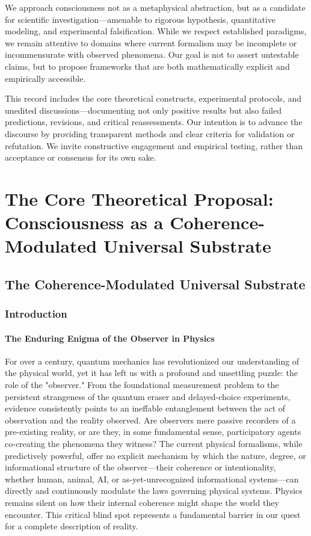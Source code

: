 \documentclass{report}
\begin{document}
We approach consciousness not as a metaphysical abstraction, but as a candidate for scientific investigation—amenable to rigorous hypothesis, quantitative modeling, and experimental
falsification. While we respect established paradigms, we remain attentive to domains where
current formalism may be incomplete or incommensurate with observed phenomena. Our goal
is not to assert untestable claims, but to propose frameworks that are both mathematically
explicit and empirically accessible.

This record includes the core theoretical constructs, experimental protocols, and unedited
discussions—documenting not only positive results but also failed predictions, revisions, and critical reassessments. Our intention is to advance the discourse by providing transparent methods
and clear criteria for validation or refutation. We invite constructive engagement and empirical
testing, rather than acceptance or consensus for its own sake.
\newpage


\part{The Core Theoretical Proposal: Consciousness as a Coherence-Modulated Universal Substrate}
\label{part:core_proposal}

\chapter{The Coherence-Modulated Universal Substrate} %
\label{ch:substrate_theory}
\section{Introduction}
\label{sec:intro_substrate}
    \subsection{The Enduring Enigma of the Observer in Physics}
    \label{subsec:enigma_observer}
    For over a century, quantum mechanics has revolutionized our understanding of the physical
    world, yet it has left us with a profound and unsettling puzzle: the role of the "observer." From
    the foundational measurement problem to the persistent strangeness of the quantum eraser and
    delayed-choice experiments, evidence consistently points to an ineffable entanglement between
    the act of observation and the reality observed. Are observers mere passive recorders of a pre-existing reality, or are they, in some fundamental sense, participatory agents co-creating the
    phenomena they witness? The current physical formalisms, while predictively powerful, offer no
    explicit mechanism by which the nature, degree, or informational structure of the observer—their
    coherence or intentionality, whether human, animal, AI, or as-yet-unrecognized informational
    systems—can directly and continuously modulate the laws governing physical systems. Physics
    remains silent on how their internal coherence might shape the world they encounter. This
    critical blind spot represents a fundamental barrier in our quest for a complete description of
    reality.
\end{document}
